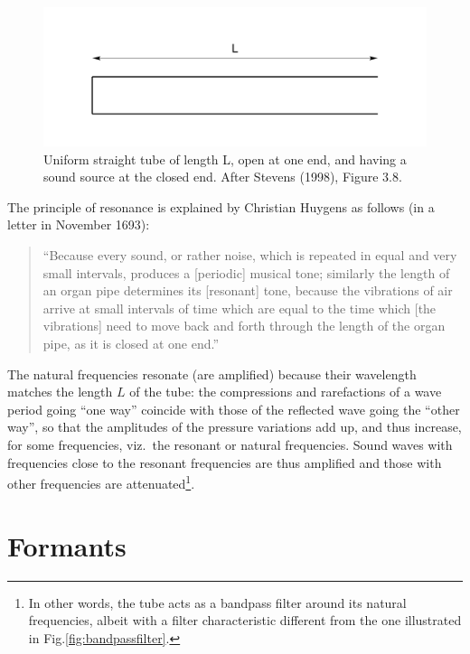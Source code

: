\documentclass[
]{book}
\begin{document}
\begin{figure}

{\centering \includegraphics{figures/onetube} 

}

\caption{Uniform straight tube of length L, open at one end, and having a sound source at the closed end. After Stevens (1998), Figure 3.8.}\label{fig:onetube}
\end{figure}

The principle of resonance is explained by Christian Huygens as follows (in a letter in November 1693):

\begin{quote}
``Because every sound, or rather noise, which is repeated in equal and very small intervals, produces a {[}periodic{]} musical tone; similarly the length of an organ pipe determines its {[}resonant{]} tone, because the vibrations of air arrive at small intervals of time which are equal to the time which {[}the vibrations{]} need to move back and forth through the length of the organ pipe, as it is closed at one end.'' \citep[571, transl. HQ]{Huygens_1905}
\end{quote}

The natural frequencies resonate (are amplified) because their wavelength matches the length \(L\) of the tube: the compressions and rarefactions of a wave period going ``one way'' coincide with those of the reflected wave going the ``other way'', so that the amplitudes of the pressure variations add up, and thus increase, for some frequencies, viz.~the resonant or natural frequencies. Sound waves with frequencies close to the resonant frequencies are thus amplified and those with other frequencies are attenuated\footnote{In other words, the tube acts as a bandpass filter around its natural frequencies, albeit with a filter characteristic different from the one illustrated in Fig.\ref{fig:bandpassfilter}.}.

\section{Formants}\label{sec:formants}
\end{document}
